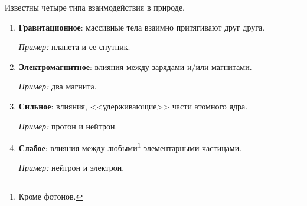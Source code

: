 \documentclass[main.tex]{subfiles}
\begin{document}




Известны четыре типа взаимодействия в природе.
\begin{enumerate}
    \item \textbf{Гравитационное}: массивные тела взаимно притягивают друг друга.

    \emph{Пример:} планета и ее спутник.
    \item \textbf{Электромагнитное}: влияния между зарядами и/или магнитами.
    
    \emph{Пример:} два магнита.
    \item \textbf{Сильное}: влияния, <<удерживающие>> части атомного ядра.

    \emph{Пример:} протон и нейтрон.
    \item \textbf{Слабое}: влияния между любыми\footnote{Кроме фотонов.} элементарными частицами.  

    \emph{Пример:} нейтрон и электрон.
\end{enumerate}









\end{document}
